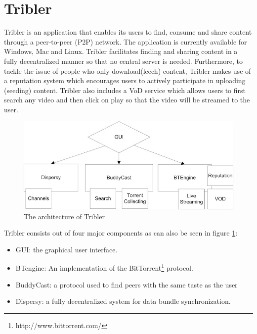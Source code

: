\section{Tribler}

Tribler is an application that enables its users to find, consume and share content through a peer-to-peer (P2P) network. The application is currently available for Windows, Mac and Linux. Tribler facilitates finding and sharing content in a fully decentralized manner so that no central server is needed. Furthermore, to tackle the issue of people who only download(leech) content, Tribler makes use of a reputation system which encourages users to actively participate in uploading (seeding) content. Tribler also includes a VoD service which allows users to first search any video and then click on play so that the video will be streamed to the user.

\begin{figure}[h]
	\centering
	\includegraphics[scale=0.4]{vod/images/tribler_component_overview.jpg}
	\caption{The architecture of Tribler\protect\footnotemark}
	\label{fig:tribler_components}
\end{figure}
\noindent Tribler consists out of four major components as can also be seen in figure \ref{fig:tribler_components}:
\begin{itemize}
	\item GUI: the graphical user interface.
	\item BTengine: An implementation of the BitTorrent\footnote{http://www.bittorrent.com/} protocol.
	\item BuddyCast: a protocol used to find peers with the same taste as the user\cite{tribler}
	\item Dispersy: a fully decentralized system for data bundle synchronization\cite{dispersy}.
\end{itemize}


